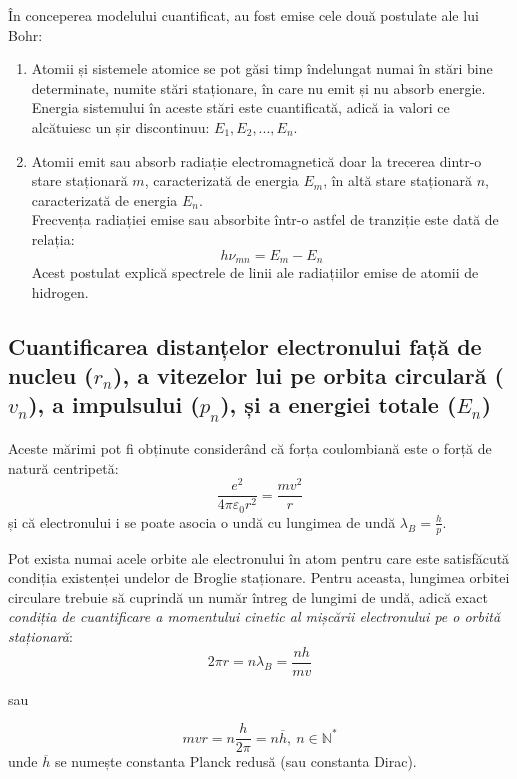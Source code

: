 În conceperea modelului cuantificat, au fost emise cele două postulate ale lui
Bohr:
\begin{enumerate}[label=\Roman*.]
    \item Atomii și sistemele atomice se pot găsi timp îndelungat numai în
        stări bine determinate, numite stări staționare, în care nu emit și nu
        absorb energie. \\
        Energia sistemului în aceste stări este cuantificată, adică ia valori
        ce alcătuiesc un șir discontinuu: \( E_1, E_2, ..., E_n \).
    \item Atomii emit sau absorb radiație electromagnetică doar la trecerea
        dintr-o stare staționară $m$, caracterizată de energia $E_m$, în altă
        stare staționară $n$, caracterizată de energia $E_n$. \\
        Frecvența radiației emise sau absorbite într-o astfel de tranziție este
        dată de relația:
        \[ h\nu_{mn} = E_m - E_n \]
        Acest postulat explică spectrele de linii ale radiațiilor emise de
        atomii de hidrogen.
\end{enumerate}

\subsection{%
    Cuantificarea distanțelor electronului față de nucleu%
    \texorpdfstring{ ($r_n$)}{}, a vitezelor lui pe orbita
    circulară\texorpdfstring{ ($v_n$)}{}, a impulsului%
    \texorpdfstring{ ($p_n$)}{}, și a energiei totale%
    \texorpdfstring{ ($E_n$)}{}
}

Aceste mărimi pot fi obținute considerând că forța coulombiană este o forță de
natură centripetă:
\begin{equation}
    \frac{e^2}{4\pi\varepsilon_0 r^2} = \frac{mv^2}{r}
    \label{eq:2}
\end{equation}
și că electronului i se poate asocia o undă cu lungimea de undă
\( \lambda_B = \frac{h}{p} \).

Pot exista numai acele orbite ale electronului în atom pentru care este
satisfăcută condiția existenței undelor de Broglie staționare. Pentru aceasta,
lungimea orbitei circulare trebuie să cuprindă un număr întreg de lungimi de
undă, adică exact \emph{condiția de cuantificare a momentului cinetic al
mișcării electronului pe o orbită staționară}:
\[ 2\pi r = n\lambda_B = \frac{nh}{mv} \]
\begin{center}
    sau
\end{center}
\begin{equation}
    mvr = n\frac{h}{2\pi} = n\overline{h}, ~ n \in \mathbb{N}^*
    \label{eq:3}
\end{equation}
unde $\overline{h}$ se numește constanta Planck redusă (sau constanta Dirac).

